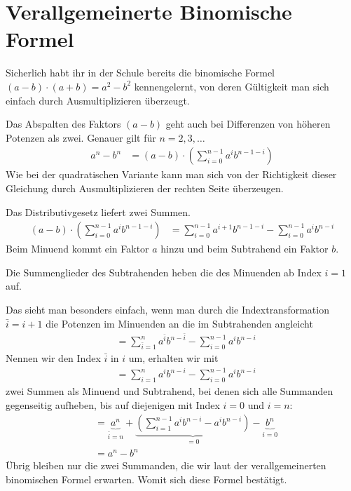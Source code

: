 \documentclass{article}
\let\l\left\let\r\right\let\cs\csname\let\ecs\endcsname\let\ea\expandafter
\begin{document}
\section{Verallgemeinerte Binomische Formel}
\label{sec:extendedBinomial}
Sicherlich habt ihr in der Schule bereits die binomische Formel
$(a-b)\cdot(a+b) = a^2-b^2$ kennengelernt, von deren Gültigkeit man
sich einfach durch Ausmultiplizieren überzeugt.

Das Abspalten des Faktors $(a-b)$ geht auch bei Differenzen von
höheren Potenzen als zwei. Genauer gilt für $n=2,3,\ldots$
\begin{align*}
  a^n - b^n &= (a-b) \cdot\l( \sum_{i=0}^{n-1} a^i b^{n-1-i}\r)
\end{align*}
Wie bei der quadratischen Variante kann man sich von der Richtigkeit
dieser Gleichung durch Ausmultiplizieren der rechten Seite überzeugen.

Das Distributivgesetz liefert zwei Summen.
\begin{align*}
  (a-b)\cdot\l(\sum_{i=0}^{n-1} a^ib^{n-1-i}\r)
  &= \sum_{i=0}^{n-1} a^{i+1}b^{n-1-i} - \sum_{i=0}^{n-1} a^i b^{n-i}
\end{align*}
Beim Minuend kommt ein Faktor $a$ hinzu und beim Subtrahend ein Faktor $b$.

Die Summenglieder des Subtrahenden heben die des Minuenden ab Index
$i=1$ auf.

Das sieht man besonders einfach, wenn man durch die
Indextransformation $\bar i = i+1$ die Potenzen im Minuenden an die im
Subtrahenden angleicht
\begin{align*}
  &= \sum_{\bar i = 1}^n a^{\bar i} b^{n-\bar i} - \sum_{i=0}^{n-1} a^i b^{n-i}
\end{align*}
Nennen wir den Index $\bar i$ in $i$ um, erhalten wir mit
\begin{align*}
  &= \sum_{i = 1}^n a^{i} b^{n-i} - \sum_{i=0}^{n-1} a^i b^{n-i}
\end{align*}
zwei Summen als Minuend und Subtrahend, bei denen sich alle
Summanden gegenseitig aufheben, bis auf diejenigen mit Index $i=0$
und $i=n$:
\begin{align*}
  &= \underbrace{a^n}_{\bar i=n} + \underbrace{\l(\sum_{i=1}^{n-1} a^i b^{n-i} - a^i b^{n-i}\r)}_{=0} - \underbrace{b^n}_{i=0}\\
  &= a^n - b^n
\end{align*}
Übrig bleiben nur die zwei Summanden, die wir laut der verallgemeinerten binomischen
Formel erwarten. Womit sich diese Formel bestätigt.
\end{document}
